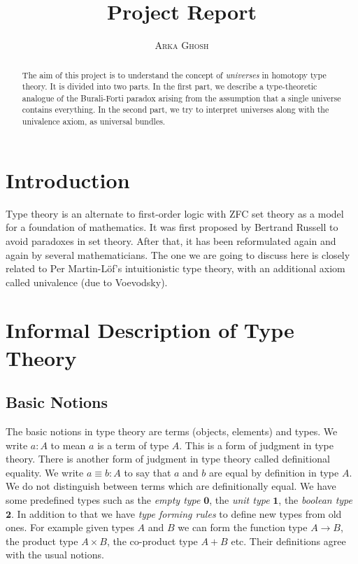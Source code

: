 \documentclass[10pt]{article}
\title{\bf{Project Report}}
\author{\textsc{Arka Ghosh}}
\theoremstyle{definition}
\theoremstyle{plain}
\theoremstyle{remark}
\begin{document}
\begin{titlepage}

\maketitle

\tableofcontents

\begin{abstract}
The aim of this project is to understand the concept of \emph{universes} 
in homotopy type theory. It is divided into two parts. In the first part, we describe 
a type-theoretic analogue of the Burali-Forti paradox arising from the assumption 
that a single universe contains everything. In the second part, we try to interpret 
universes along with the univalence axiom, as universal bundles. 
\end{abstract}

\end{titlepage}

\section{Introduction}\label{Intro}
Type theory is an alternate to first-order logic with ZFC set theory as a model for a
foundation of mathematics. It was first proposed by Bertrand Russell to avoid paradoxes in 
set theory. After that, it has been reformulated again and again by several mathematicians. 
The one we are going to discuss here is closely related to Per Martin-L\"of's intuitionistic 
type theory, with an additional axiom called univalence (due to Voevodsky).


\section{Informal Description of Type Theory}

\subsection{Basic Notions}

The basic notions in type theory are terms (objects, elements) and types.  We write 
$a : A$ to mean $a$ is a term of type $A$. This is a form of judgment in type theory.
There is another form of judgment in type theory called definitional equality. We write
$a \equiv b : A$ to say that $a$ and $b$ are equal by definition in type $A$. We do not
distinguish between terms which are definitionally equal. We have some predefined types such 
as the \emph{empty type} $\mathbf{0}$, the \emph{unit type} $\mathbf{1}$, 
the \emph{boolean type} $\mathbf{2}$. In addition to that we have \emph{type forming rules} 
to define new types from old ones. For example given types $A$ and $B$ we can form the 
function type $A \to B$, the product type $A \times B$, the co-product type $A + B$ etc. 
Their definitions agree with the usual notions.\smallskip
\end{document}
